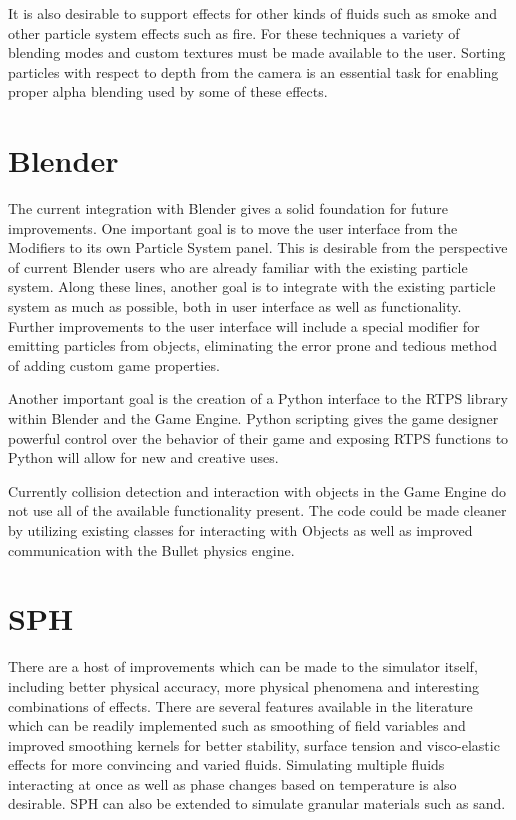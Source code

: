 It is also desirable to support effects for other kinds of fluids such as smoke
and other particle system effects such as fire. For these techniques a variety
of blending modes and custom textures must be made available to the user.
Sorting particles with respect to depth from the camera is an essential task
for enabling proper alpha blending used by some of these effects.

\section{Blender}

The current integration with Blender gives a solid foundation for future
improvements. One important goal is to move the user interface from the
Modifiers to its own Particle System panel. This is desirable from the
perspective of current Blender users who are already familiar with the existing
particle system. Along these lines, another goal is to integrate with the
existing particle system as much as possible, both in user interface as well as
functionality.
Further improvements to the user interface will include a special modifier for
emitting particles from objects, eliminating the error prone and tedious method
of adding custom game properties. 


Another important goal is the creation of a Python interface to the RTPS
library within Blender and the Game Engine. Python scripting gives the game
designer powerful control over the behavior of their game and exposing RTPS
functions to Python will allow for new and creative uses. 


Currently collision detection and interaction with objects in the Game Engine
do not use all of the available functionality present. The code could be made
cleaner by utilizing existing classes for interacting with Objects as well as
improved communication with the Bullet physics engine.  

\section{SPH}

There are a host of improvements which can be made to the simulator itself,
including better physical accuracy, more physical phenomena and interesting
combinations of effects.
There are several features available in the literature which can be readily
implemented such as smoothing of field variables and improved smoothing kernels for better
stability\cite{Liu2010}, surface tension and visco-elastic
effects for more convincing and varied fluids\cite{Clavet2005}. Simulating
multiple fluids interacting at once as well as phase changes based on
temperature is also desirable.\cite{Muller2005} SPH can also be extended to
simulate granular materials such as sand.\cite{Bell2005}


